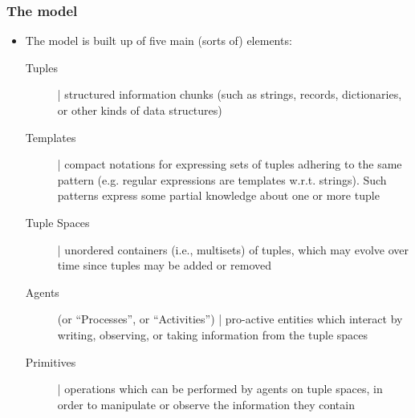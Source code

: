 \documentclass[presentation]{beamer}\mode<presentation>{\usetheme{AMSCesenaPurpleAndGold}}
\begin{document}
\begin{frame}%
\frametitle{The \linda{} model}

\begin{itemize}
	\item The \linda{} model is built up of five main (sorts of) elements:
	\begin{description}
		\item[Tuples] | structured information chunks (such as strings, records, dictionaries, or other kinds of \alert{data structures})

		\item[Templates] | compact notations for expressing sets of tuples adhering to the same pattern (e.g. regular expressions are templates w.r.t. strings).
		Such patterns express some \alert{partial knowledge} about one or more tuple

		\item[Tuple Spaces] | unordered containers (i.e., \alert{multisets}) of tuples, which may evolve over time since tuples may be added or removed

		\item[Agents] (or ``Processes'', or ``Activities'') | pro-active entities which interact by writing, observing, or taking information from the tuple spaces

		\item[Primitives] | operations which can be performed by agents on tuple spaces, in order to manipulate or observe the information they contain
	\end{description}
\end{itemize}
\end{frame}

\end{document}
